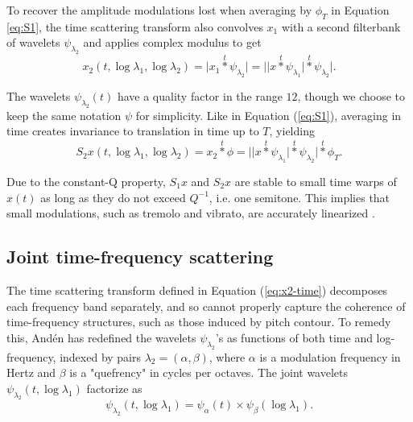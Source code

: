 \documentclass[twoside,a4paper]{article}
\begin{document}
To recover the amplitude modulations lost when averaging by $\phi_T$ in
Equation \ref{eq:S1}, the time scattering transform also convolves $x_1$ with a second filterbank of wavelets $\psi_{\lambda_2}$ and applies complex modulus to get
\begin{equation}
x_2 (t, \log \lambda_1, \log \lambda_2) =
\vert x_1 \overset{t}{\ast} \psi_{\lambda_2} \vert =
\vert \vert x \overset{t}{\ast} \psi_{\lambda_{1}} \vert
\overset{t}{\ast} \psi_{\lambda_{2}} \vert.
\label{eq:x2-time}
\end{equation}

The wavelets $\psi_{\lambda_2}(t)$ have a quality factor in the range $1$\textendash$2$, though we choose to keep the same notation $\psi$ for simplicity. Like in Equation (\ref{eq:S1}), averaging in time creates invariance to translation in time up to $T$, yielding
\begin{equation}
S_2 x (t, \log \lambda_1, \log \lambda_2) =
x_2 \overset{t}{\ast} \phi =
\vert \vert x \overset{t}{\ast} \psi_{\lambda_{1}} \vert
\overset{t}{\ast} \psi_{\lambda_{2}} \vert
\overset{t}{\ast} \phi_T.
\label{eq:S2-time}
\end{equation}

Due to the constant-Q property, $S_1 x$ and $S_2 x$ are stable to small time warps of $x(t)$ as long as they do not exceed $Q^{-1}$, i.e. one semitone. This implies that small modulations, such as tremolo and vibrato, are accurately linearized \cite{Anden2012, Anden2014DSS}.

\subsection{Joint time-frequency scattering}

The time scattering transform defined in Equation (\ref{eq:x2-time}) decomposes each frequency band separately, and so cannot properly capture the coherence of time-frequency structures, such as those induced by pitch contour. To remedy this, And\'{e}n \cite{Anden2014PhD} has redefined the wavelets $\psi_{\lambda_2}$'s as functions of both time and log-frequency, indexed by pairs $\lambda_2 = (\alpha,\beta)$, where $\alpha$ is a modulation frequency in Hertz and $\beta$ is a "quefrency" in cycles per octaves. The joint wavelets $\psi_{\lambda_2}(t,\log \lambda_1)$ factorize as
\begin{equation}
\psi_{\lambda_2}(t,\log \lambda_1) = \psi_\alpha (t) \times \psi_\beta (\log \lambda_1).
\label{eq:wavelet-joint}
\end{equation}
\end{document}
